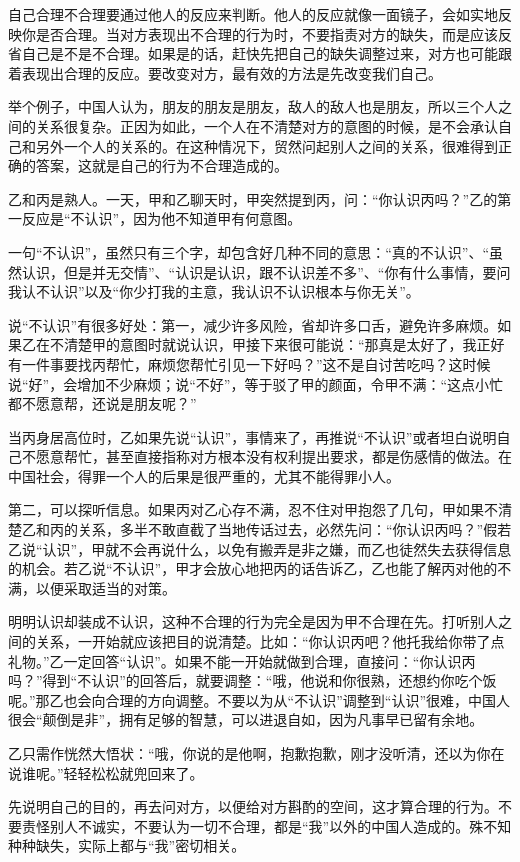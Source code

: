 \documentclass[fontset=fandol, a4paper, 12pt, openright]{ctexbook}
\begin{document}
自己合理不合理要通过他人的反应来判断。他人的反应就像一面镜子，会如实地反映你是否合理。当对方表现出不合理的行为时，不要指责对方的缺失，而是应该反省自己是不是不合理。如果是的话，赶快先把自己的缺失调整过来，对方也可能跟着表现出合理的反应。要改变对方，最有效的方法是先改变我们自己。

举个例子，中国人认为，朋友的朋友是朋友，敌人的敌人也是朋友，所以三个人之间的关系很复杂。正因为如此，一个人在不清楚对方的意图的时候，是不会承认自己和另外一个人的关系的。在这种情况下，贸然问起别人之间的关系，很难得到正确的答案，这就是自己的行为不合理造成的。

乙和丙是熟人。一天，甲和乙聊天时，甲突然提到丙，问：“你认识丙吗？”乙的第一反应是“不认识”，因为他不知道甲有何意图。

一句“不认识”，虽然只有三个字，却包含好几种不同的意思：“真的不认识”、“虽然认识，但是并无交情”、“认识是认识，跟不认识差不多”、“你有什么事情，要问我认不认识”以及“你少打我的主意，我认识不认识根本与你无关”。

说“不认识”有很多好处：第一，减少许多风险，省却许多口舌，避免许多麻烦。如果乙在不清楚甲的意图时就说认识，甲接下来很可能说：“那真是太好了，我正好有一件事要找丙帮忙，麻烦您帮忙引见一下好吗？”这不是自讨苦吃吗？这时候说“好”，会增加不少麻烦；说“不好”，等于驳了甲的颜面，令甲不满：“这点小忙都不愿意帮，还说是朋友呢？”

当丙身居高位时，乙如果先说“认识”，事情来了，再推说“不认识”或者坦白说明自己不愿意帮忙，甚至直接指称对方根本没有权利提出要求，都是伤感情的做法。在中国社会，得罪一个人的后果是很严重的，尤其不能得罪小人。

第二，可以探听信息。如果丙对乙心存不满，忍不住对甲抱怨了几句，甲如果不清楚乙和丙的关系，多半不敢直截了当地传话过去，必然先问：“你认识丙吗？”假若乙说“认识”，甲就不会再说什么，以免有搬弄是非之嫌，而乙也徒然失去获得信息的机会。若乙说“不认识”，甲才会放心地把丙的话告诉乙，乙也能了解丙对他的不满，以便采取适当的对策。

明明认识却装成不认识，这种不合理的行为完全是因为甲不合理在先。打听别人之间的关系，一开始就应该把目的说清楚。比如：“你认识丙吧？他托我给你带了点礼物。”乙一定回答“认识”。如果不能一开始就做到合理，直接问：“你认识丙吗？”得到“不认识”的回答后，就要调整：“哦，他说和你很熟，还想约你吃个饭呢。”那乙也会向合理的方向调整。不要以为从“不认识”调整到“认识”很难，中国人很会“颠倒是非”，拥有足够的智慧，可以进退自如，因为凡事早已留有余地。

乙只需作恍然大悟状：“哦，你说的是他啊，抱歉抱歉，刚才没听清，还以为你在说谁呢。”轻轻松松就兜回来了。

先说明自己的目的，再去问对方，以便给对方斟酌的空间，这才算合理的行为。不要责怪别人不诚实，不要认为一切不合理，都是“我”以外的中国人造成的。殊不知种种缺失，实际上都与“我”密切相关。
\end{document}
